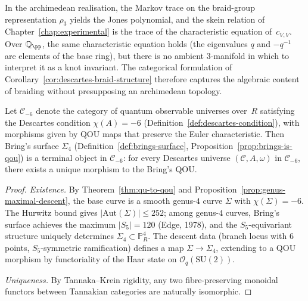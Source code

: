 \begin{remark}
\label{rem:skein-archimedean-shadow}
In the archimedean realisation, the Markov trace on the braid-group
representation $\rho_3$ yields the Jones polynomial, and the skein
relation of Chapter~\ref{chap:experimental} is the trace of the
characteristic equation of~$c_{V,V}$.  Over $\mathbb{Q}_\pp$, the
same characteristic equation holds (the eigenvalues $q$ and $-q^{-1}$
are elements of the base ring), but there is no ambient $3$-manifold in
which to interpret it as a knot invariant.  The categorical formulation
of Corollary~\ref{cor:descartes-braid-structure} therefore captures
the algebraic content of braiding without presupposing an archimedean
topology.
\end{remark}


\begin{theorem}
\label{thm:descartes}
Let $\mathcal{C}_{-6}$ denote the category of quantum observable universes
over~$R$ satisfying the Descartes condition $\chi(A) = -6$
(Definition~\ref{def:descartes-condition}), with morphisms given by QOU maps
that preserve the Euler characteristic.  Then Bring's surface $\Sigma_4$
(Definition~\ref{def:brings-surface},
Proposition~\ref{prop:brings-is-qou}) is a terminal object in
$\mathcal{C}_{-6}$: for every Descartes universe
$(\mathcal{C}, A, \omega)$ in $\mathcal{C}_{-6}$, there exists a unique
morphism to the Bring's QOU.
\end{theorem}

\begin{proof}
\emph{Existence.}\;
By Theorem~\ref{thm:qu-to-qou} and
Proposition~\ref{prop:genus-maximal-descent}, the base curve is a smooth
genus-$4$ curve $\Sigma$ with $\chi(\Sigma) = -6$.
The Hurwitz bound gives $\lvert\mathrm{Aut}(\Sigma)\rvert \leq 252$;
among genus-$4$ curves, Bring's surface achieves the maximum
$\lvert S_5\rvert = 120$ (Edge, 1978), and the $S_5$-equivariant structure
uniquely determines $\Sigma_4 \subset \mathbb{P}^4_R$.
The descent data (branch locus with $6$ points, $S_5$-symmetric
ramification) defines a map $\Sigma \to \Sigma_4$, extending to a QOU
morphism by functoriality of the Haar state on
$\mathcal{O}_q(\mathrm{SU}(2))$.

\emph{Uniqueness.}\;
By Tannaka--Krein rigidity, any two fibre-preserving monoidal functors
between Tannakian categories are naturally isomorphic.
\end{proof}

